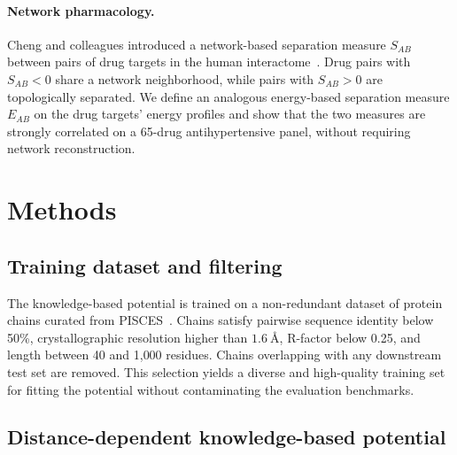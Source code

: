 \documentclass[11pt]{article}
\begin{document}
\paragraph{Network pharmacology.}
Cheng and colleagues introduced a network-based separation measure $S_{AB}$
between pairs of drug targets in the human
interactome~\citep{zhou2020network}. Drug pairs with $S_{AB}<0$ share a
network neighborhood, while pairs with $S_{AB}>0$ are topologically separated.
We define an analogous energy-based separation measure $E_{AB}$ on the drug
targets' energy profiles and show that the two measures are strongly
correlated on a 65-drug antihypertensive panel, without requiring network
reconstruction.

\section{Methods}
\label{sec:methods}

\subsection{Training dataset and filtering}

The knowledge-based potential is trained on a non-redundant dataset of protein
chains curated from PISCES~\citep{wang2003pisces}. Chains satisfy pairwise
sequence identity below 50\%, crystallographic resolution higher than
$1.6~\si{\angstrom}$, R-factor below 0.25, and length between 40 and 1{,}000
residues. Chains overlapping with any downstream test set are removed. This
selection yields a diverse and high-quality training set for fitting the
potential without contaminating the evaluation benchmarks.

\subsection{Distance-dependent knowledge-based potential}
\end{document}
